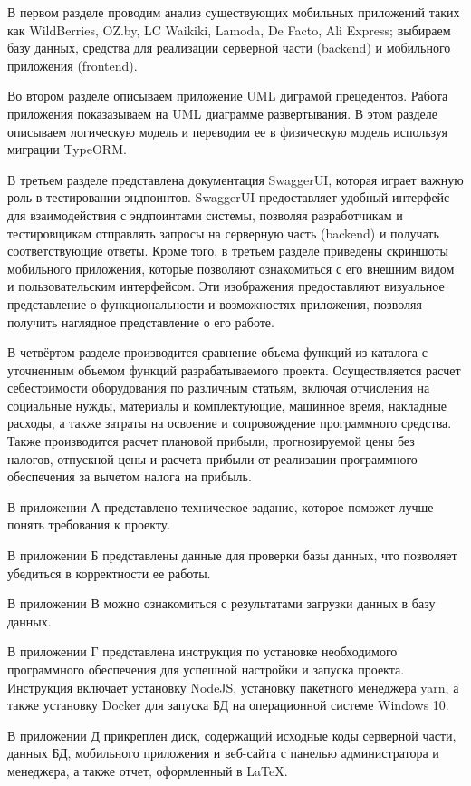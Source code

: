 В первом разделе
проводим анализ существующих мобильных приложений таких как
WildBerries, OZ.by, LC Waikiki, Lamoda, De Facto, Ali Express;
выбираем базу данных, средства для реализации серверной части (backend) и мобильного приложения (frontend).

Во втором разделе
описываем приложение UML диграмой прецедентов.
Работа приложения показазываем на UML диаграмме развертывания.
В этом разделе описываем логическую модель и переводим ее в физическую модель используя миграции TypeORM.

В третьем разделе
представлена документация SwaggerUI, которая играет важную роль в тестировании эндпоинтов.
SwaggerUI предоставляет удобный интерфейс для взаимодействия с эндпоинтами системы,
позволяя разработчикам и тестировщикам отправлять запросы на серверную часть (backend)
и получать соответствующие ответы.
Кроме того, в третьем разделе приведены скриншоты мобильного приложения,
которые позволяют ознакомиться с его внешним видом и пользовательским интерфейсом.
Эти изображения предоставляют визуальное представление о функциональности и возможностях приложения,
позволяя получить наглядное представление о его работе.

В четвёртом разделе
производится сравнение объема функций из каталога с уточненным объемом функций разрабатываемого проекта.
Осуществляется расчет себестоимости оборудования по различным статьям,
включая отчисления на социальные нужды, материалы и комплектующие,
машинное время, накладные расходы, а также затраты на освоение и сопровождение программного средства.
Также производится расчет плановой прибыли, прогнозируемой цены без налогов, отпускной цены и
расчета прибыли от реализации программного обеспечения за вычетом налога на прибыль.

В приложении А
представлено техническое задание, которое поможет лучше понять требования к проекту.

В приложении Б
представлены данные для проверки базы данных, что позволяет убедиться в корректности ее работы.

В приложении В
можно ознакомиться с результатами загрузки данных в базу данных.

В приложении Г
представлена инструкция по установке необходимого программного обеспечения для успешной настройки и запуска проекта.
Инструкция включает установку NodeJS, установку пакетного менеджера yarn,
а также установку Docker для запуска БД на операционной системе Windows 10.

В приложении Д
прикреплен диск, содержащий исходные коды серверной части, данных БД,
мобильного приложения и веб-сайта с панелью администратора и менеджера,
а также отчет, оформленный в LaTeX.


\newpage
